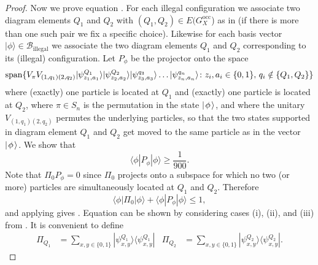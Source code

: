 \documentclass[../thesis-main/thesis-main]{subfiles}
\begin{document}
\begin{proof}
Now we prove equation . For each illegal configuration we associate two diagram elements $Q_{1}$ and $Q_{2}$ with $(Q_{1},Q_{2})\in E(G_X^{\text{occ}}$) as in  (if there is more than one such pair we fix a specific choice). Likewise for each basis vector $|\phi\rangle\in\mathcal{B}_{{\text{illegal}}}$ we associate the two diagram elements $Q_{1}$ and $Q_{2}$ corresponding to its (illegal) configuration. Let $P_{\phi}$ be the projector onto the space
\begin{equation}
\operatorname{span}\{ V_\pi V_{(1,q_1)(2,q_2)}|\psi_{z_{1},a_{1}}^{Q_{1}}\rangle|\psi_{z_{2},a_{2}}^{Q_{2}}\rangle|\psi_{z_{3},a_{3}}^{q_{3}}\rangle\ldots|\psi_{z_{n},a_{n}}^{q_{n}}\rangle\colon z_{i},a_{i}\in\{0,1\},\, q_{i}\notin\{Q_{1},Q_{2}\}\} 
\end{equation}
where (exactly) one particle is located at $Q_{1}$ and (exactly) one particle is located at $Q_{2}$, where $\pi\in S_n$ is the permutation in the state $|\mspace{2mu} \phi \mspace{2mu} \rangle$, and where the unitary $V_{(1,q_1)(2,q_2)}$ permutes the underlying particles, so that the two states supported in diagram element $Q_1$ and $Q_2$ get moved to the same particle as in the vector $|\mspace{2mu} \phi \mspace{2mu} \rangle$. We show that 
\begin{equation}
\langle\phi|P_{\phi}|\phi\rangle\geq\frac{1}{900}.\label{eq:q1_q2_eqn}
\end{equation}
Note that $\Pi_{0}P_{\phi}=0$ since $\Pi_0$ projects onto a subspace for which no two (or more) particles are simultaneously located at $Q_1$ and $Q_2$. Therefore 
\begin{equation}
\langle\phi|\Pi_{0}|\phi\rangle+\langle\phi|P_{\phi}|\phi\rangle\leq1,
\end{equation}
and applying  gives . Equation  can be shown by considering cases (i), (ii), and (iii) from . It is convenient to define 
\begin{align}
  \Pi_{Q_{1}} &= \sum_{x,y\in\{0,1\}}|\psi_{x,y}^{Q_{1}}\rangle\langle\psi_{x,y}^{Q_{1}}| &
  \Pi_{Q_{2}} &= \sum_{x,y\in\{0,1\}}|\psi_{x,y}^{Q_{2}}\rangle\langle\psi_{x,y}^{Q_{2}}|.
\end{align}


\end{proof}
\end{document}
